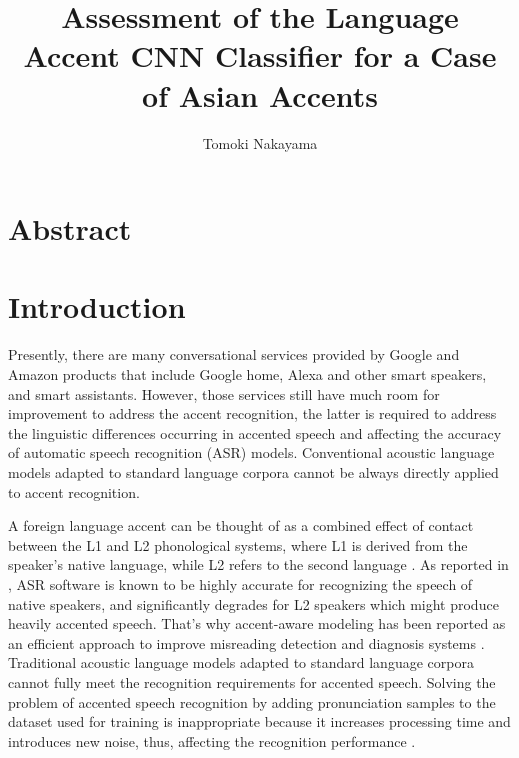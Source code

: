 \documentclass[ams]{U-AizuGT}
\author{Tomoki Nakayama}
\title{Assessment of the Language Accent CNN Classifier for a Case of Asian Accents}
\begin{document}
\maketitle

\section*{Abstract}

\section{Introduction}
Presently, there are many conversational services provided by Google and Amazon products that include Google home, Alexa and other smart speakers, and smart assistants. However, those services still have much room for improvement to address the accent recognition, the latter is required to address the linguistic differences occurring in accented speech and affecting the accuracy of automatic speech recognition (ASR) models.
Conventional acoustic language models adapted to standard language corpora cannot be always directly applied to accent recognition.

A foreign language accent can be thought of as a combined effect of contact between the L1 and L2 phonological systems, where L1 is derived from the speaker's native language, while L2 refers to the second language \cite{Veranika:lang, Boula:the}. As reported in \cite{Rogerson:com}, ASR software is known to be highly accurate for recognizing the speech of native speakers, and significantly degrades for L2 speakers which might produce heavily accented speech. That's why accent-aware modeling has been reported as an efficient approach to improve misreading detection and diagnosis systems \cite{Jiang:tow, Algabri:mis}. Traditional acoustic language models adapted to standard language corpora cannot fully meet the recognition requirements for accented speech. Solving the problem of accented speech recognition by adding pronunciation samples to the dataset used for training is inappropriate because it increases processing time and introduces new noise, thus, affecting the recognition performance \cite{Deshpande:acc}. 
\end{document}
